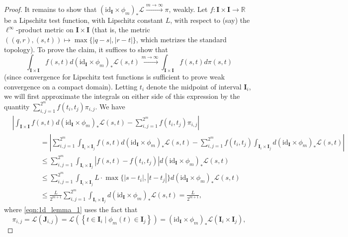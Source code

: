 \documentclass{article}
\theoremstyle{definition}
\newcommand{\R}{\mathbb{R}}
\begin{document}
\begin{proof}
    It remains to show that $(\mathrm{id}_\mathbf{I} \times \phi_m)_\ast \mathscr{L} \xrightarrow{m \to \infty} \pi$, weakly. Let $f:\mathbf{I} \times \mathbf{I} \to \R$ be a Lipschitz test function, with Lipschitz constant $L$, with respect to (say) the $\ell^\infty$-product metric on $\mathbf{I} \times \mathbf{I}$ (that is, the metric $\left((q,r),(s,t)\right) \mapsto \max\{|q-s|,|r-t|\}$, which metrizes the standard topology). To prove the claim, it suffices to show that 
    \[
    \int_{\mathbf{I} \times \mathbf{I}} f(s,t) d(\mathrm{id}_\mathbf{I}\times \phi_m)_\ast \mathscr{L}(s,t) \xrightarrow{m \to \infty} \int_{\mathbf{I} \times \mathbf{I}} f(s,t) d\pi(s,t)
    \]
    (since convergence for Lipschitz test functions is sufficient to prove weak convergence on a compact domain). Letting $t_i$ denote the midpoint of interval $\mathbf{I}_i$, we will first approximate the integrals on either side of this expression by the quantity $\sum_{i,j=1}^{2^m} f(t_i,t_j)\pi_{i,j}$.
    We have 
    \begin{align}
        &\left|\int_{\mathbf{I} \times \mathbf{I}} f(s,t) d(\mathrm{id}_\mathbf{I} \times \phi_m)_\ast \mathscr{L}(s,t) - \sum_{i,j=1}^{2^m} f(t_i,t_j)\pi_{i,j} \right| \nonumber \\
        & \qquad \qquad = \left|\sum_{i,j=1}^{2^m} \int_{\mathbf{I}_i \times \mathbf{I}_j} f(s,t) d(\mathrm{id}_\mathbf{I} \times \phi_m)_\ast \mathscr{L}(s,t) - \sum_{i,j=1}^{2^m}  f(t_i,t_j) \int_{\mathbf{I}_i \times \mathbf{I}_j} d(\mathrm{id}_\mathbf{I} \times \phi_m)_\ast \mathscr{L}(s,t) \right| \label{eqn:1d_lemma_1}\\
        & \qquad \qquad \leq \sum_{i,j=1}^{2^m} \int_{\mathbf{I}_i \times \mathbf{I}_j} |f(s,t) - f(t_i,t_j)| d(\mathrm{id}_\mathbf{I} \times \phi_m)_\ast \mathscr{L}(s,t) \nonumber \\
        &\qquad \qquad \leq  \sum_{i,j=1}^{2^m} \int_{\mathbf{I}_i \times \mathbf{I}_j} L \cdot \max\{|s-t_i|,|t-t_j|\} d(\mathrm{id}_\mathbf{I} \times \phi_m)_\ast \mathscr{L}(s,t) \label{eqn:1d_lemma_2} \\
        &\qquad \qquad \leq \frac{L}{2^{m+1}}\sum_{i,j=1}^{2^m} \int_{\mathbf{I}_i \times \mathbf{I}_j}  d(\mathrm{id}_\mathbf{I} \times \phi_m)_\ast \mathscr{L}(s,t) = \frac{L}{2^{m+1}}, \label{eqn:1d_lemma_3}
    \end{align}
    where \eqref{eqn:1d_lemma_1} uses the fact that
    \begin{equation*}
    \pi_{i,j} = \mathscr{L}(\mathbf{J}_{i,j}) = \mathscr{L}\left(\left\{t \in \mathbf{I}_i \mid \phi_m(t) \in \mathbf{I}_j \right\} \right) = (\mathrm{id}_\mathbf{I}\times \phi_m)_\ast \mathscr{L}(\mathbf{I}_i \times \mathbf{I}_j),

\end{equation*}
\end{proof}
\end{document}
